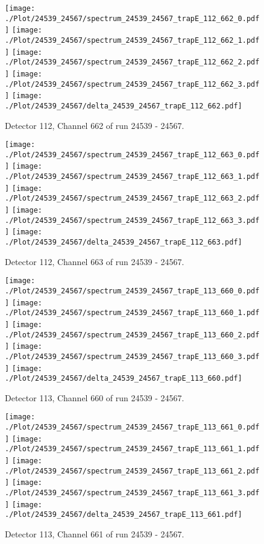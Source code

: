 \begin{figure}[hb]
\centering
\texttt{[image: ./Plot/24539\_24567/spectrum\_24539\_24567\_trapE\_112\_662\_0.pdf]}
\texttt{[image: ./Plot/24539\_24567/spectrum\_24539\_24567\_trapE\_112\_662\_1.pdf]}
\texttt{[image: ./Plot/24539\_24567/spectrum\_24539\_24567\_trapE\_112\_662\_2.pdf]}
\texttt{[image: ./Plot/24539\_24567/spectrum\_24539\_24567\_trapE\_112\_662\_3.pdf]}
\texttt{[image: ./Plot/24539\_24567/delta\_24539\_24567\_trapE\_112\_662.pdf]}
\caption{ Detector 112, Channel 662 of run 24539 - 24567.}
\label{fig:24539_24567_trapE_112_662}
\end{figure}
\clearpage
\begin{figure}[hb]
\centering
\texttt{[image: ./Plot/24539\_24567/spectrum\_24539\_24567\_trapE\_112\_663\_0.pdf]}
\texttt{[image: ./Plot/24539\_24567/spectrum\_24539\_24567\_trapE\_112\_663\_1.pdf]}
\texttt{[image: ./Plot/24539\_24567/spectrum\_24539\_24567\_trapE\_112\_663\_2.pdf]}
\texttt{[image: ./Plot/24539\_24567/spectrum\_24539\_24567\_trapE\_112\_663\_3.pdf]}
\texttt{[image: ./Plot/24539\_24567/delta\_24539\_24567\_trapE\_112\_663.pdf]}
\caption{ Detector 112, Channel 663 of run 24539 - 24567.}
\label{fig:24539_24567_trapE_112_663}
\end{figure}
\clearpage
\begin{figure}[hb]
\centering
\texttt{[image: ./Plot/24539\_24567/spectrum\_24539\_24567\_trapE\_113\_660\_0.pdf]}
\texttt{[image: ./Plot/24539\_24567/spectrum\_24539\_24567\_trapE\_113\_660\_1.pdf]}
\texttt{[image: ./Plot/24539\_24567/spectrum\_24539\_24567\_trapE\_113\_660\_2.pdf]}
\texttt{[image: ./Plot/24539\_24567/spectrum\_24539\_24567\_trapE\_113\_660\_3.pdf]}
\texttt{[image: ./Plot/24539\_24567/delta\_24539\_24567\_trapE\_113\_660.pdf]}
\caption{ Detector 113, Channel 660 of run 24539 - 24567.}
\label{fig:24539_24567_trapE_113_660}
\end{figure}
\clearpage
\begin{figure}[hb]
\centering
\texttt{[image: ./Plot/24539\_24567/spectrum\_24539\_24567\_trapE\_113\_661\_0.pdf]}
\texttt{[image: ./Plot/24539\_24567/spectrum\_24539\_24567\_trapE\_113\_661\_1.pdf]}
\texttt{[image: ./Plot/24539\_24567/spectrum\_24539\_24567\_trapE\_113\_661\_2.pdf]}
\texttt{[image: ./Plot/24539\_24567/spectrum\_24539\_24567\_trapE\_113\_661\_3.pdf]}
\texttt{[image: ./Plot/24539\_24567/delta\_24539\_24567\_trapE\_113\_661.pdf]}
\caption{ Detector 113, Channel 661 of run 24539 - 24567.}
\label{fig:24539_24567_trapE_113_661}
\end{figure}
